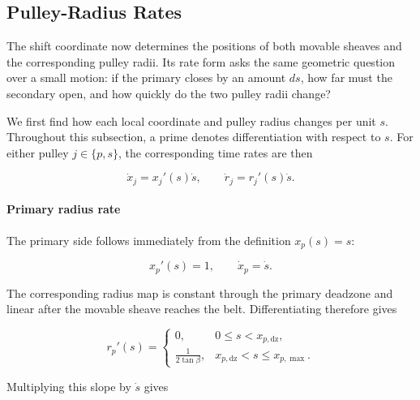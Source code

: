 \documentclass[11pt]{report}
\numberwithin{equation}{section}
\begin{document}
\subsection{Pulley-Radius Rates}
\label{sec:pulley_radius_rates}

The shift coordinate now determines the positions of both movable sheaves and
the corresponding pulley radii. Its rate form asks the same geometric question
over a small motion: if the primary closes by an amount \(ds\), how far must
the secondary open, and how quickly do the two pulley radii change?

We first find how each local coordinate and pulley radius changes per unit
\(s\). Throughout this subsection, a prime denotes differentiation with
respect to \(s\). For either pulley \(j\in\{p,s\}\), the corresponding time
rates are then

\begin{equation}
    \dot x_j=x_j'(s)\dot s,
    \qquad
    \dot r_j=r_j'(s)\dot s.
    \label{eq:shift_to_time_rate}
\end{equation}

\paragraph{Primary radius rate}

The primary side follows immediately from the definition \(x_p(s)=s\):

\begin{equation}
    x_p'(s)=1,
    \qquad
    \dot x_p=\dot s.
    \label{eq:primary_axial_rate}
\end{equation}

The corresponding radius map is constant through the primary deadzone and
linear after the movable sheave reaches the belt. Differentiating
 therefore gives

\begin{equation}
    r_p'(s)
    =
    \begin{cases}
        0,
        & 0\leq s<x_{p,\mathrm{dz}},\\[8pt]
        \displaystyle
        \frac{1}{2\tan\beta},
        & x_{p,\mathrm{dz}}<s\leq x_{p,\max}.
    \end{cases}
    \label{eq:primary_radius_shift_derivative}
\end{equation}

Multiplying this slope by \(\dot s\) gives
\end{document}
